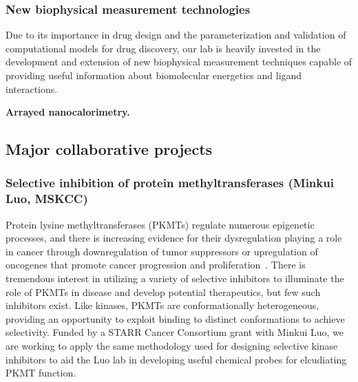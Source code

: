 \documentclass[10pt]{article}
\begin{document}
\vspace{-0.3cm}
\subsubsection*{New biophysical measurement technologies}
\vspace{-0.3cm}

Due to its importance in drug design and the parameterization and validation of computational models for drug discovery, our lab is heavily invested in the development and extension of new biophysical measurement techniques capable of providing useful information about biomolecular energetics and ligand interactions.

{\bf Arrayed nanocalorimetry.}


\subsection*{Major collaborative projects}

\subsubsection*{Selective inhibition of protein methyltransferases (Minkui Luo, MSKCC)}
\vspace{-0.3cm}
Protein lysine methyltransferases (PKMTs) regulate numerous epigenetic processes, and there is increasing evidence for their dysregulation playing a role in cancer through downregulation of tumor suppressors or upregulation of oncogenes that promote cancer progression and proliferation~\cite{Copeland:2009:Nat.Rev.DrugDiscov.}.
There is tremendous interest in utilizing a variety of selective inhibitors to illuminate the role of PKMTs in disease and develop potential therapeutics, but few such inhibitors exist.
Like kinases, PKMTs are conformationally heterogeneous, providing an opportunity to exploit binding to distinct conformations to achieve selectivity.
Funded by a STARR Cancer Consortium grant with Minkui Luo, we are working to apply the same methodology used for designing selective kinase inhibitors to aid the Luo lab in developing useful chemical probes for elcudiating PKMT function.
\end{document}
